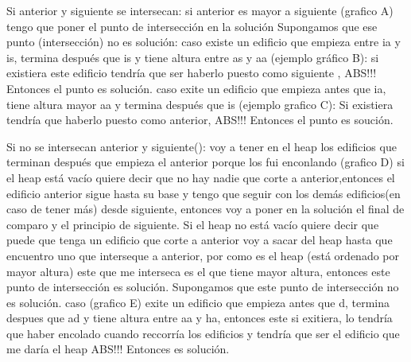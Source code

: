 \documentclass{article}
\begin{document}
Si anterior y siguiente se intersecan:\newline
	si anterior es mayor a siguiente (grafico A)\newline
		tengo que poner el punto de intersección en la solución\newline
		Supongamos que ese punto (intersección) no es solución:\newline
			caso existe un edificio que empieza entre ia y is, termina después que is y tiene altura entre as y aa (ejemplo gráfico B):\newline
			si existiera este edificio tendría que ser haberlo puesto como siguiente , ABS!!!\newline
			Entonces el punto es solución.\newline
			caso exite un edificio que empieza antes que ia, tiene altura mayor aa y termina después que is (ejemplo grafico C):\newline
			Si existiera tendría que haberlo puesto como anterior, ABS!!!\newline
			Entonces el punto es soución.\newline

Si no se intersecan anterior y siguiente():\newline
	voy a tener en el heap los edificios que terminan después que empieza el anterior porque los fui enconlando (grafico D)
	si el heap está vacío quiere decir que no hay nadie que corte a anterior,entonces el edificio anterior sigue hasta su base y tengo que seguir con los demás edificios(en caso de tener más) desde siguiente, entonces voy a poner en la solución el final de comparo y el principio de siguiente.\newline
	Si el heap no está vacío quiere decir que puede que tenga un edificio que corte a anterior 
		voy a sacar del heap hasta que encuentro uno que interseque a anterior, por como es el heap (está ordenado por mayor altura) este que me interseca es el que tiene mayor altura, entonces este punto
		de intersección es solución.\newline
		Supongamos que este punto de intersección no es solución.\newline
		caso (grafico E) exite un edificio que empieza antes que d, termina despues que ad y tiene altura entre aa y ha, entonces este si exitiera, lo tendría que haber encolado cuando reccorría los edificios y tendría que ser el edificio que me daría el heap ABS!!!\newline
		Entonces es solución.\newline
		
	\color{red}{NO ME GUSTA NADA ESTA DEMO! igual no es la final}\color{black}
\end{document}
